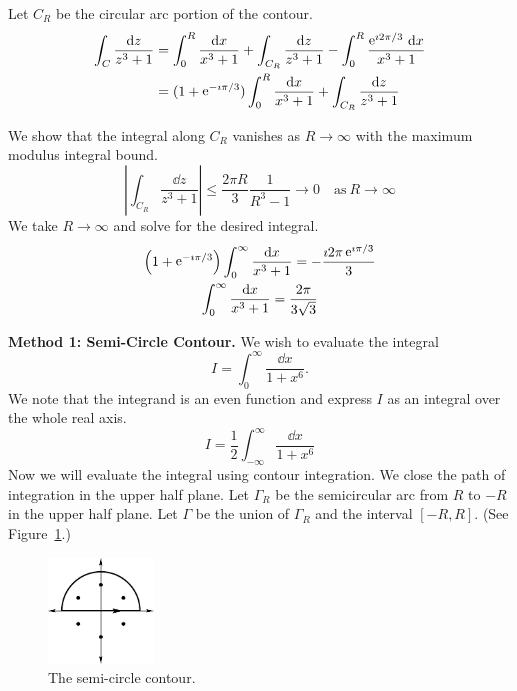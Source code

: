 {\begin{Solution}
\begin{enumerate}
    Let $C_R$ be the circular arc portion of the contour.
    \begin{align*}
      \int_C \frac{\mathrm{d} z}{z^3 + 1} 
      &= \int_0^R \frac{\mathrm{d} x}{x^3 + 1} 
      + \int_{C_R} \frac{\mathrm{d} z}{z^3 + 1} -
      \int_0^R \frac{\mathop{\mathrm{e}}\nolimits^{\imath 2 \pi/3}\,\mathrm{d} x}{x^3 + 1}  
      \\
      &= (1 + \mathop{\mathrm{e}}\nolimits^{- \imath \pi / 3}) \int_0^R \frac{\mathrm{d} x}{x^3 + 1}
      + \int_{C_R} \frac{\mathrm{d} z}{z^3 + 1}
    \end{align*}

    We show that the integral along $C_R$ vanishes as $R \to \infty$ with the maximum
    modulus integral bound.
    \[
    \left| \int_{C_R} \frac{\dd z}{z^3 + 1} \right| 
    \leq \frac{2 \pi R}{3} \frac{1}{R^3 - 1} 
    \to 0 \quad \mathrm{as}\ R \to \infty
    \]
    We take $R \to \infty$ and solve for the desired integral.
    \begin{gather*}
      \left( 1 + \mathop{\mathrm{e}}\nolimits^{-\imath \pi/3} \right) \int_0^\infty \frac{\mathrm{d} x}{x^3 + 1} 
      = - \frac{ \imath 2 \pi \mathop{\mathrm{e}}\nolimits^{\imath \pi/3} }{ 3 }
      \\
      \int_0^\infty \frac{\mathrm{d} x}{x^3 + 1} = \frac{2 \pi}{3 \sqrt{3}}
    \end{gather*}
  \end{enumerate}
\end{Solution}










\begin{Solution}
  \label{solution 1/(1+x^6)}
  \textbf{Method 1: Semi-Circle Contour.}
  We wish to evaluate the integral
  \[
  I = \int_0^\infty \frac{\dd x}{1 + x^6}.
  \]
  We note that the integrand is an even function and express $I$ as an integral
  over the whole real axis.
  \[
  I = \frac{1}{2} \int_{-\infty}^\infty \frac{\dd x}{1 + x^6}
  \]
  Now we will evaluate the integral using contour integration.
  We close the path of integration in the upper half plane.
  Let $\Gamma_R$ be the semicircular arc from $R$ to $-R$ in the upper half plane.
  Let $\Gamma$ be the union of $\Gamma_R$ and the interval $[-R,R]$.
  (See Figure~\ref{semi_circle_1x6}.)
  \begin{figure}[tb!]
    \begin{center}
      \includegraphics[width=0.25\textwidth]{fcv/residue/semi_circle_1x6}
    \end{center}
    \caption{The semi-circle contour.}
    \label{semi_circle_1x6}
  \end{figure}


\end{Solution}}
